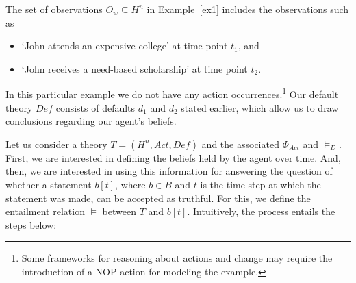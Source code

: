 \documentclass{article}
\begin{document}
The set of observations $O_w\subseteq H^n$ in Example~\ref{ex1} includes the observations such as 
\begin{itemize}
    \item `John attends an expensive college' at time point $t_1$, and 
    \item `John receives a need-based scholarship' at time point $t_2$.
\end{itemize}
 In this particular example we do not have any  action occurrences.\footnote{Some frameworks for reasoning about actions and change may require the introduction of a NOP action for modeling the example.} Our default theory $Def$ consists of defaults $d_1$ and $d_2$ stated earlier, which allow us to draw conclusions regarding our agent's beliefs. 

Let us consider a theory $T = (H^n, Act, \textit{Def})$ and the associated $\Phi_{Act}$ and $\models_D$. First, we are interested in defining the beliefs held by the agent over time. And, then, we are interested in using this information for answering the question of whether a statement $b[t]$,  where $b \in B$ and $t$ is the time step at which the statement was made, can be accepted as truthful. For this, we define the entailment relation $\models$ between $T$ and $b[t]$. Intuitively, the process entails the steps below: %
\end{document}

